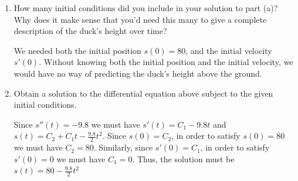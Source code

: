 \documentclass[main]{subfiles}
\begin{document}
\begin{enumerate}
\begin{enumerate}
  \item
  \begin{problem}[2in]
    How many initial conditions did you include in your solution to part (a)?  Why does it make sense that you'd
    need this many to give a complete description of the duck's height over time?
  \end{problem}
  \begin{solution}
    We needed both the initial position $s(0)=80$, and the initial velocity $s'(0)$.
    Without knowing both the initial position and the initial velocity, we would
    have no way of predicting the duck's height above the ground.
  \end{solution}

\item 
\begin{problem}
    Obtain a solution to the differential equation above subject to the given initial conditions.
\end{problem}
\begin{solution}
    Since $s''(t) = -9.8$ we must have $s'(t) = C_1-9.8 t$ and $\displaystyle s(t) = C_2 + C_1 t -\frac{9.8}{2} t^2$. Since $s(0) = C_2$, in order to satisfy $s(0) = 80$ we must have $C_2 = 80$. Similarly, since $s'(0) = C_1$, in order to satisfy $s'(0) = 0$ we must have $C_1 = 0$. Thus, the solution must be $\displaystyle\boxed{s(t)=80 - \frac{9.8}{2}t^2}$
\end{solution}
  


  \end{enumerate}








    
\end{enumerate}
\end{document}
